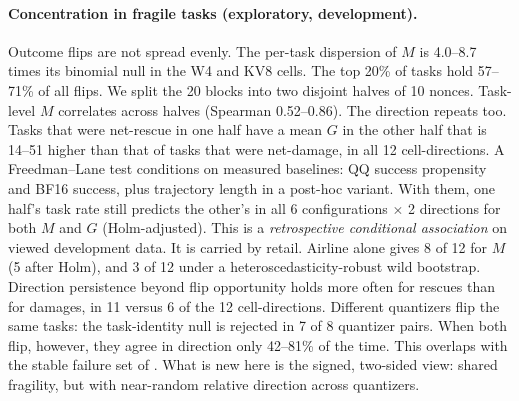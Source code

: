 \paragraph{Concentration in fragile tasks (exploratory, development).} Outcome flips are not spread evenly. The per-task dispersion of $M$ is 4.0--8.7 times its binomial null in the W4 and KV8 cells. The top 20\% of tasks hold 57--71\% of all flips. %
We split the 20 blocks into two disjoint halves of 10 nonces. Task-level $M$ correlates across halves (Spearman 0.52--0.86). The direction repeats too. Tasks that were net-rescue in one half have a mean $G$ in the other half that is 14--51\pp{} higher than that of tasks that were net-damage, in all 12 cell-directions. %
A Freedman--Lane test conditions on measured baselines: QQ success propensity and BF16 success, plus trajectory length in a post-hoc variant. With them, one half's task rate still predicts the other's in all 6 configurations $\times$ 2 directions for both $M$ and $G$ (Holm-adjusted). This is a \emph{retrospective conditional association} on viewed development data. It is carried by retail. Airline alone gives 8 of 12 for $M$ (5 after Holm), and 3 of 12 under a heteroscedasticity-robust wild bootstrap. %
Direction persistence beyond flip opportunity holds more often for rescues than for damages, in 11 versus 6 of the 12 cell-directions. Different quantizers flip the same tasks: the task-identity null is rejected in 7 of 8 quantizer pairs. When both flip, however, they agree in direction only 42--81\% of the time. %
This overlaps with the stable failure set of \citet{jang2026flat}. What is new here is the signed, two-sided view: shared fragility, but with near-random relative direction across quantizers.

